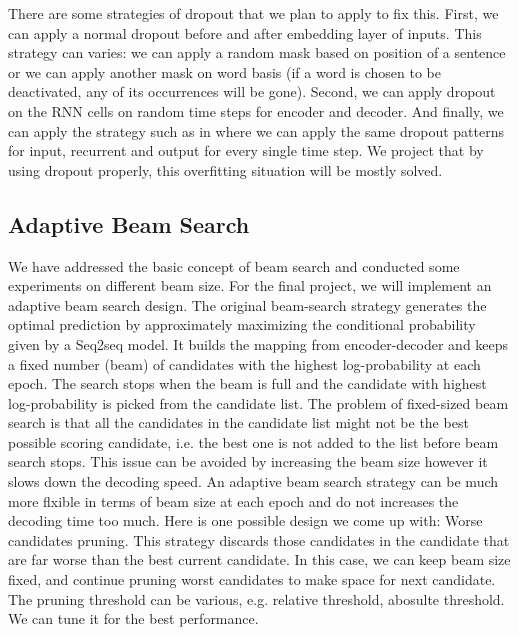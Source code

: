 \documentclass[11pt,a4paper]{article}
\begin{document}
There are some strategies of dropout that we plan to apply to fix this. First, we can apply a normal dropout before and after embedding layer of inputs. This strategy can varies: we can apply a random mask based on position of a sentence or we can apply another mask on word basis (if a word is chosen to be deactivated, any of its occurrences will be gone). Second, we can apply dropout on the RNN cells on random time steps for encoder and decoder. And finally, we can apply the strategy such as in \cite{gal2016theoretically} where we can apply the same dropout patterns for input, recurrent and output for every single time step. We project that by using dropout properly, this overfitting situation will be mostly solved. 

\subsection{Adaptive Beam Search} \label{sec:adaptive}

We have addressed the basic concept of beam search and conducted some experiments on different beam size. For the final project, we will implement an adaptive beam search design. The original beam-search strategy generates the optimal prediction by approximately maximizing the conditional probability given by a Seq2seq model.  It builds the mapping from encoder-decoder and keeps a fixed number (beam) of candidates with the highest log-probability at each epoch. The search stops when the beam is full and the candidate with highest log-probability is picked from the candidate list. The problem of fixed-sized beam search is that all the candidates in the candidate list might not be the best possible scoring candidate, i.e. the best one is not added to the list before beam search stops. This issue can be avoided by increasing the beam size however it slows down the decoding speed. An adaptive beam search strategy can be much more flxible in terms of beam size at each epoch and do not increases the decoding time too much. Here is one possible design we come up with: Worse candidates pruning. This strategy discards those candidates in the candidate that are far worse than the best current candidate. In this case, we can keep beam size fixed, and continue pruning worst candidates to make space for next candidate. The pruning threshold can be various, e.g. relative threshold, abosulte threshold. We can tune it for the best performance. 
\end{document}
